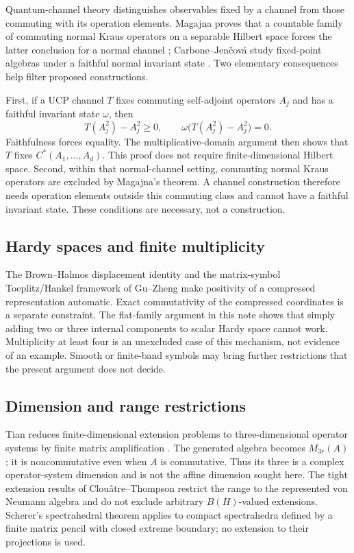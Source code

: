 \documentclass[11pt,letterpaper]{amsart}
\theoremstyle{definition}
\theoremstyle{remark}
\numberwithin{equation}{section}
\begin{document}
Quantum-channel theory distinguishes observables fixed by a channel
from those commuting with its operation elements. Magajna proves that
a countable family of commuting normal Kraus operators on a separable
Hilbert space forces the latter conclusion for a normal channel
\cite[Theorem 4.6]{Mag}; Carbone--Jen\v{c}ov\'a study fixed-point algebras
under a faithful normal invariant state \cite[Proposition 4]{CJ}.
Two elementary consequences help filter proposed constructions.

First, if a UCP channel $T$ fixes commuting self-adjoint operators $A_j$
and has a faithful invariant state $\omega$, then
\[
 T(A_j^2)-A_j^2\ge0,\qquad
 \omega\bigl(T(A_j^2)-A_j^2\bigr)=0.
\]
Faithfulness forces equality. The multiplicative-domain argument then
shows that $T$ fixes $C^*(A_1,\ldots,A_d)$. This proof does not require
finite-dimensional Hilbert space. Second, within that normal-channel setting, commuting normal Kraus
operators are excluded by Magajna's theorem. A channel construction
therefore needs operation elements outside this commuting class and
cannot have a faithful invariant state. These conditions are necessary,
not a construction.

\subsection{Hardy spaces and finite multiplicity}

The Brown--Halmos displacement identity and the matrix-symbol
Toeplitz/Hankel framework of Gu--Zheng \cite{BH,GZ} make positivity of
a compressed representation automatic. Exact commutativity of the
compressed coordinates is a separate constraint. The flat-family
argument in this note shows that simply adding two or three internal
components to scalar Hardy space cannot work. Multiplicity at least
four is an unexcluded case of this mechanism, not evidence of an
example. Smooth or finite-band symbols may bring further restrictions
that the present argument does not decide.

\subsection{Dimension and range restrictions}

Tian reduces finite-dimensional extension problems to three-dimensional
operator systems by finite matrix amplification \cite{Tian}. The
generated algebra becomes $M_{3r}(A)$; it is noncommutative even when
$A$ is commutative. Thus its three is a complex operator-system
dimension and is not the affine dimension sought here. The tight
extension results of Clou\^atre--Thompson \cite{CT} restrict the range
to the represented von Neumann algebra and do not exclude arbitrary
$B(H)$-valued extensions. Scherer's spectrahedral theorem
\cite[Theorem 3.7]{spectra} applies to compact spectrahedra defined by a finite
matrix pencil with closed extreme boundary; no extension to their
projections is used.
\end{document}
